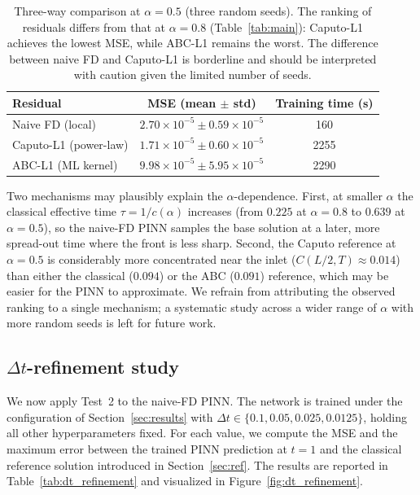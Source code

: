 \documentclass[11pt]{article}
\begin{document}
\begin{table}[h]
\centering
\caption{Three-way comparison at \(\alpha = 0.5\) (three random
         seeds). The ranking of residuals differs from that at
         \(\alpha = 0.8\) (Table~\ref{tab:main}): Caputo-L1 achieves
         the lowest MSE, while ABC-L1 remains the worst. The difference
         between naive FD and Caputo-L1 is borderline and should be
         interpreted with caution given the limited number of seeds.}
\label{tab:alpha05}
\begin{tabular}{lcc}
\toprule
Residual & MSE (mean \(\pm\) std) & Training time (s) \\
\midrule
Naive FD (local)   & \(2.70\times 10^{-5} \pm 0.59\times 10^{-5}\) & 160 \\
Caputo-L1 (power-law) & \(1.71\times 10^{-5} \pm 0.60\times 10^{-5}\) & 2255 \\
ABC-L1 (ML kernel) & \(9.98\times 10^{-5} \pm 5.95\times 10^{-5}\) & 2290 \\
\bottomrule
\end{tabular}
\end{table}

Two mechanisms may plausibly explain the \(\alpha\)-dependence. First,
at smaller \(\alpha\) the classical effective time
\(\tau = 1/c(\alpha)\) increases (from \(0.225\) at \(\alpha=0.8\) to
\(0.639\) at \(\alpha=0.5\)), so the naive-FD PINN samples the base
solution at a later, more spread-out time where the front is less
sharp. Second, the Caputo reference at \(\alpha=0.5\) is considerably
more concentrated near the inlet (\(C(L/2,T)\approx 0.014\)) than
either the classical (\(0.094\)) or the ABC (\(0.091\)) reference,
which may be easier for the PINN to approximate. We refrain from
attributing the observed ranking to a single mechanism; a systematic
study across a wider range of \(\alpha\) with more random seeds is
left for future work.

\subsection{\(\Delta t\)-refinement study}
\label{sec:dt_refinement_study}

We now apply Test~2 to the naive-FD PINN. The network is trained under
the configuration of Section~\ref{sec:results} with \(\Delta t \in
\{0.1, 0.05, 0.025, 0.0125\}\), holding all other hyperparameters fixed.
For each value, we compute the MSE and the maximum error between the
trained PINN prediction at \(t=1\) and the classical reference solution
introduced in Section~\ref{sec:ref}. The results are reported in
Table~\ref{tab:dt_refinement} and visualized in
Figure~\ref{fig:dt_refinement}.
\end{document}

